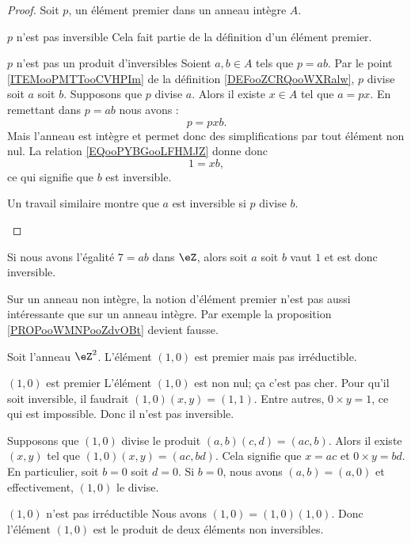 \begin{proof}
    Soit \( p\), un élément premier dans un anneau intègre \( A\).
    \begin{subproof}
        \item[\( p\) n'est pas inversible]
            Cela fait partie de la définition d'un élément premier.
        \item[\( p\) n'est pas un produit d'inversibles]
            Soient \( a,b\in A\) tels que \( p=ab\). Par le point \ref{ITEMooPMTTooCVHPIm} de la définition \ref{DEFooZCRQooWXRalw}, \( p\) divise soit \( a\) soit \( b\). Supposons que \( p\) divise \( a\). Alors il existe \( x\in A\) tel que \( a=px\). En remettant dans \( p=ab\) nous avons :
            \begin{equation}        \label{EQooPYBGooLFHMJZ}
                p=pxb.
            \end{equation}
            Mais l'anneau est intègre et permet donc des simplifications par tout élément non nul. La relation \ref{EQooPYBGooLFHMJZ} donne donc 
            \begin{equation}
                1=xb,
            \end{equation}
            ce qui signifie que \( b\) est inversible.

            Un travail similaire montre que \( a\) est inversible si \( p\) divise \( b\).
    \end{subproof}
\end{proof}

\begin{example}
    Si nous avons l'égalité \( 7=ab\) dans \( \eZ\), alors soit \( a\) soit \( b\) vaut \( 1\) et est donc inversible.
\end{example}

Sur un anneau non intègre, la notion d'élément premier n'est pas aussi intéressante que sur un anneau intègre. Par exemple la proposition \ref{PROPooWMNPooZdvOBt} devient fausse.

\begin{example}     \label{EXooEIUEooCZCPMC}
    Soit l'anneau \( \eZ^2\). L'élément \( (1,0)\) est premier mais pas irréductible.
    \begin{subproof}
        \item[\( (1,0)\) est premier]
            L'élément \( (1,0)\) est non nul; ça c'est pas cher. Pour qu'il soit inversible, il faudrait \( (1,0)(x,y)=(1,1)\). Entre autres, \( 0\times y=1\), ce qui est impossible. Donc il n'est pas inversible.

            Supposons que \( (1,0)\) divise le produit \( (a,b)(c,d)=(ac,b)\). Alors il existe \( (x,y)\) tel que \( (1,0)(x,y)=(ac,bd)\). Cela signifie que \( x=ac\) et \( 0\times y=bd\). En particulier, soit \( b=0\) soit \( d=0\). Si \( b=0\), nous avons \( (a,b)=(a,0)\) et effectivement, \( (1,0)\) le divise.
        \item[\( (1,0)\) n'est pas irréductible]
            Nous avons \( (1,0)=(1,0)(1,0)\). Donc l'élément \( (1,0)\) est le produit de deux éléments non inversibles.
    \end{subproof}
\end{example}

